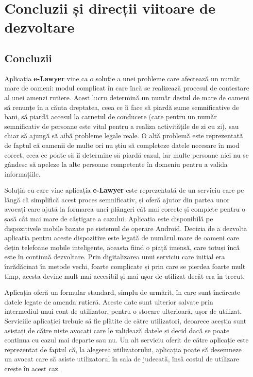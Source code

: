 \documentclass[12pt,a4paper]{report}
\theoremstyle{definition}
\theoremstyle{remark}
\begin{document}
\chapter{Concluzii și direcții viitoare de dezvoltare}

\section{Concluzii}

Aplicația \textbf{e-Lawyer} vine ca o soluție a unei probleme care afectează un număr mare de oameni: modul complicat în care încă se realizează procesul de contestare al unei amenzi rutiere. Acest lucru determină un număr destul de mare de oameni să renunțe în a căuta dreptatea, ceea ce îi face să piardă sume semnificative de bani, să piardă accesul la carnetul de conducere (care pentru un număr semnificativ de persoane este vital pentru a realiza activitățile de zi cu zi), sau chiar să ajungă să aibă probleme legale reale. O altă problemă este reprezentată de faptul că oamenii de multe ori nu știu să completeze datele necesare în mod corect, ceea ce poate să îi determine să piardă cazul, iar multe persoane nici nu se gândesc să apeleze la alte persoane competente în domeniu pentru a valida informațiile.

Soluția cu care vine aplicația \textbf{e-Lawyer} este reprezentată de un serviciu care pe lângă că simplifică acest proces semnificativ, și oferă ajutor din partea unor avocați care ajută la formarea unei plângeri cât mai corecte și complete pentru o șasă cât mai mare de câștigare a cazului. Aplicația este disponibilă pe dispozitivele mobile bazate pe sistemul de operare Android. Decizia de a dezvolta aplicația pentru aceste dispozitive este legată de numărul mare de oameni care dețin telefoane mobile inteligente, aceasta fiind o piață imensă, care totuși încă este în continuă dezvoltare. Prin digitalizarea unui serviciu care inițial era înrădăcinat în metode vechi, foarte complicate și prin care se pierdea foarte mult timp, acesta devine mult mai accesibil și mai ușor de utilizat decât era în trecut. 

Aplicația oferă un formular standard, simplu de urmărit, în care sunt încărcate datele legate de amenda rutieră. Aceste date sunt ulterior salvate prin intermediul unui cont de utilizator, pentru o stocare ulterioară, ușor de utilizat. Serviciile aplicației trebuie să fie plătite de către utilizatori, deoarece aceștia sunt asistați de către niște avocați care le validează datele și decid dacă se poate continua cu cazul mai departe sau nu. Un alt serviciu oferit de către aplicație este reprezentat de faptul că, la alegerea utilizatorului, aplicația poate să desemneze un avocat care să asiste utilizatorul în sala de judecată, însă costul de utilizare crește în acest caz.
\end{document}

